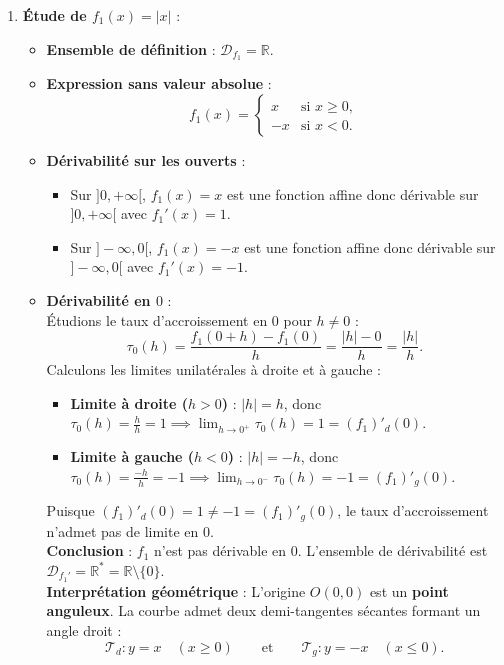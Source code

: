 \documentclass[11pt,a4paper]{article}
\newcommand{\R}{\mathbb{R}}
\begin{document}
\begin{correctionbox}
\begin{enumerate}[label=\textbf{\arabic*.}]
    \item \textbf{Étude de $f_1(x) = |x|$} :
    \begin{itemize}
        \item \textbf{Ensemble de définition} : $\mathcal{D}_{f_1} = \R$.
        \item \textbf{Expression sans valeur absolue} :
        \[
        f_1(x) = \begin{cases}
        x & \text{si } x \ge 0, \\
        -x & \text{si } x < 0.
        \end{cases}
        \]
        \item \textbf{Dérivabilité sur les ouverts} :
        \begin{itemize}
            \item Sur $]0, +\infty[$, $f_1(x) = x$ est une fonction affine donc dérivable sur $]0, +\infty[$ avec $f_1'(x) = 1$.
            \item Sur $]-\infty, 0[$, $f_1(x) = -x$ est une fonction affine donc dérivable sur $]-\infty, 0[$ avec $f_1'(x) = -1$.
        \end{itemize}
        \item \textbf{Dérivabilité en $0$} :\\
        Étudions le taux d'accroissement en $0$ pour $h \neq 0$ :
        \[
        \tau_0(h) = \frac{f_1(0+h) - f_1(0)}{h} = \frac{|h| - 0}{h} = \frac{|h|}{h}.
        \]
        Calculons les limites unilatérales à droite et à gauche :
        \begin{itemize}
            \item \textbf{Limite à droite ($h > 0$)} : $|h| = h$, donc $\tau_0(h) = \frac{h}{h} = 1 \implies \lim_{h \to 0^+} \tau_0(h) = 1 = (f_1)'_d(0)$.
            \item \textbf{Limite à gauche ($h < 0$)} : $|h| = -h$, donc $\tau_0(h) = \frac{-h}{h} = -1 \implies \lim_{h \to 0^-} \tau_0(h) = -1 = (f_1)'_g(0)$.
        \end{itemize}
        Puisque $(f_1)'_d(0) = 1 \neq -1 = (f_1)'_g(0)$, le taux d'accroissement n'admet pas de limite en $0$.\\
        \textbf{Conclusion} : $f_1$ n'est pas dérivable en $0$. L'ensemble de dérivabilité est $\mathcal{D}_{f_1'} = \R^* = \R \setminus \{0\}$.\\
        \textbf{Interprétation géométrique} : L'origine $O(0, 0)$ est un \textbf{point anguleux}. La courbe admet deux demi-tangentes sécantes formant un angle droit :
        \[
        \mathcal{T}_d : y = x \quad (x \ge 0) \qquad \text{et} \qquad \mathcal{T}_g : y = -x \quad (x \le 0).
        \]
    \end{itemize}


\end{enumerate}
\end{correctionbox}
\end{document}
